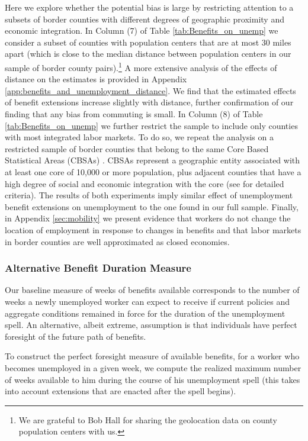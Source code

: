 \documentclass[12pt]{article}
\newcommand{\1}{\mathbf{1}}
\begin{document}
Here we explore whether the potential bias is large by restricting attention to a subsets of border counties with different degrees of geographic proximity and economic integration. In Column (7) of Table \ref{tab:Benefits_on_unemp} we consider a subset of counties with population centers that are at most 30 miles apart (which is close to the median distance between population centers in our sample of border county pairs).\footnote{We are grateful to Bob Hall for sharing the geolocation data on county population centers with us.} A more extensive analysis of the effects of distance on the estimates is provided in Appendix \ref{app:benefits_and_unemployment_distance}. We find that the estimated effects of benefit extensions increase slightly with distance, further confirmation of our finding that any bias from commuting is small. In Column (8) of Table \ref{tab:Benefits_on_unemp} we further restrict the sample to include only counties with most integrated labor markets. To do so, we repeat the analysis on a restricted sample of border counties that belong to the same Core Based Statistical Areas (CBSAs) \citep{data:census-geo}. CBSAs represent a geographic entity associated with at least one core of 10,000 or more population, plus adjacent counties that have a high degree of social and economic integration with the core (see \citet{omb:2010} for detailed criteria). The results of both experiments imply similar effect of unemployment benefit extensions on unemployment to the one found in our full sample. Finally, in Appendix \ref{sec:mobility} we present evidence that workers do not change the location of employment in response to changes in benefits and that labor markets in border counties are well approximated as closed economies.


\subsubsection{Alternative Benefit Duration Measure}
\label{sec:perfect_foresight}

Our baseline measure of weeks of benefits available corresponds to the number of weeks a newly unemployed worker can expect to receive if current policies and aggregate conditions remained in force for the duration of the unemployment spell. An alternative, albeit extreme, assumption is that individuals have perfect foresight of the future path of benefits.

To construct the perfect foresight measure of available benefits, for a worker who becomes unemployed in a given week, we compute the realized maximum number of weeks available to him during the course of his unemployment spell (this takes into account extensions that are enacted after the spell begins).
\end{document}
